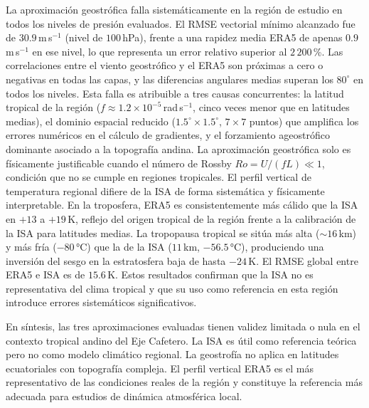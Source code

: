 \documentclass[12pt, a4paper]{article}
\begin{document}
La aproximación geostrófica falla sistemáticamente en
la región de estudio en todos los niveles de presión evaluados.
El RMSE vectorial mínimo alcanzado fue de $30.9$\,m\,s$^{-1}$
(nivel de $100$\,hPa), frente a una rapidez media ERA5 de
apenas $0.9$\,m\,s$^{-1}$ en ese nivel, lo que representa un
error relativo superior al $2\,200$\,\%. Las correlaciones entre
el viento geostrófico y el ERA5 son próximas a cero o negativas
en todas las capas, y las diferencias angulares medias superan
los $80^{\circ}$ en todos los niveles. Esta falla es atribuible
a tres causas concurrentes: la latitud tropical de la región
($f \approx 1.2 \times 10^{-5}$\,rad\,s$^{-1}$, cinco veces
menor que en latitudes medias), el dominio espacial reducido
($1.5^{\circ} \times 1.5^{\circ}$, $7 \times 7$ puntos) que
amplifica los errores numéricos en el cálculo de gradientes,
y el forzamiento ageostrófico dominante asociado a la
topografía andina. La aproximación geostrófica solo es
físicamente justificable cuando el número de Rossby
$Ro = U/(fL) \ll 1$, condición que no se cumple en regiones
tropicales. El perfil vertical de temperatura regional difiere
de la ISA de forma sistemática y físicamente interpretable.
En la troposfera, ERA5 es consistentemente más cálido que la
ISA en $+13$ a $+19$\,K, reflejo del origen tropical de la
región frente a la calibración de la ISA para latitudes medias.
La tropopausa tropical se sitúa más alta ($\sim\!16$\,km) y
más fría ($-80$\,°C) que la de la ISA ($11$\,km, $-56.5$\,°C),
produciendo una inversión del sesgo en la estratosfera baja
de hasta $-24$\,K. El RMSE global entre ERA5 e ISA es de
$15.6$\,K. Estos resultados confirman que la ISA no es
representativa del clima tropical y que su uso como referencia
en esta región introduce errores sistemáticos significativos.

En síntesis, las tres aproximaciones evaluadas tienen validez
limitada o nula en el contexto tropical andino del Eje
Cafetero. La ISA es útil como referencia teórica pero no
como modelo climático regional. La geostrofía no aplica en
latitudes ecuatoriales con topografía compleja. El perfil
vertical ERA5 es el más representativo de las condiciones
reales de la región y constituye la referencia más adecuada
para estudios de dinámica atmosférica local.

\newpage


\end{document}
